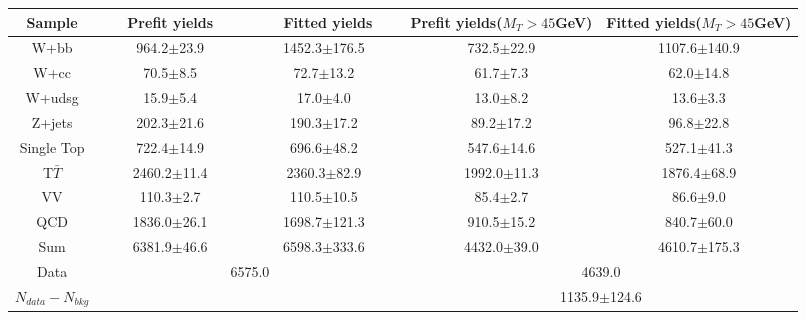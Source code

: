  \begin{adjustbox}{width=1.\textwidth,center=\textwidth}
   \begin{tabular} {c|cc|cc} \hline\hline
			 Sample & ~~~Prefit yields~~~ & ~~~~Fitted yields~~~ & Prefit yields($M_T>45$GeV) & Fitted yields($M_T>45$GeV) \\ 
 \hline
W+bb&964.2$\pm$23.9&1452.3$\pm$176.5&732.5$\pm$22.9&1107.6$\pm$140.9\\
W+cc&70.5$\pm$8.5&72.7$\pm$13.2&61.7$\pm$7.3&62.0$\pm$14.8\\
W+udsg&15.9$\pm$5.4&17.0$\pm$4.0&13.0$\pm$8.2&13.6$\pm$3.3\\
Z+jets&202.3$\pm$21.6&190.3$\pm$17.2&89.2$\pm$17.2&96.8$\pm$22.8\\
Single Top&722.4$\pm$14.9&696.6$\pm$48.2&547.6$\pm$14.6&527.1$\pm$41.3\\
T$\bar{T}$&2460.2$\pm$11.4&2360.3$\pm$82.9&1992.0$\pm$11.3&1876.4$\pm$68.9\\
VV&110.3$\pm$2.7&110.5$\pm$10.5&85.4$\pm$2.7&86.6$\pm$9.0\\
QCD&1836.0$\pm$26.1&1698.7$\pm$121.3&910.5$\pm$15.2&840.7$\pm$60.0\\
\hline
Sum &6381.9$\pm$46.6&6598.3$\pm$333.6&4432.0$\pm$39.0&4610.7$\pm$175.3\\
\hline
Data&\multicolumn{2}{c}{6575.0}&\multicolumn{2}{c}{4639.0}\\
   \hline
$N_{data}-N_{bkg}$&\multicolumn{2}{c}{}&\multicolumn{2}{c}{1135.9$\pm$124.6}\\
   \hline\hline
   \end{tabular}
 \end{adjustbox}
